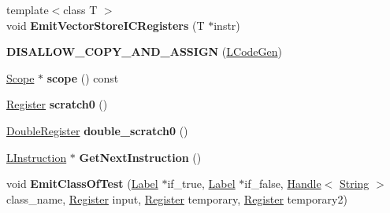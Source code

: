 \begin{DoxyCompactItemize}
\item 
{\footnotesize template$<$class T $>$ }\\void {\bfseries Emit\+Vector\+Store\+I\+C\+Registers} (T $\ast$instr)\hypertarget{classv8_1_1internal_1_1_l_code_gen_a84c9b0e87f89361233a5c74e43d689cb}{}\label{classv8_1_1internal_1_1_l_code_gen_a84c9b0e87f89361233a5c74e43d689cb}

\item 
{\bfseries D\+I\+S\+A\+L\+L\+O\+W\+\_\+\+C\+O\+P\+Y\+\_\+\+A\+N\+D\+\_\+\+A\+S\+S\+I\+GN} (\hyperlink{classv8_1_1internal_1_1_l_code_gen}{L\+Code\+Gen})\hypertarget{classv8_1_1internal_1_1_l_code_gen_a475eb7b3d7738263ae865905cf36b985}{}\label{classv8_1_1internal_1_1_l_code_gen_a475eb7b3d7738263ae865905cf36b985}

\item 
\hyperlink{classv8_1_1internal_1_1_scope}{Scope} $\ast$ {\bfseries scope} () const \hypertarget{classv8_1_1internal_1_1_l_code_gen_a2b85c964ccc4e59f50d49d19b0ed5ce0}{}\label{classv8_1_1internal_1_1_l_code_gen_a2b85c964ccc4e59f50d49d19b0ed5ce0}

\item 
\hyperlink{structv8_1_1internal_1_1_register}{Register} {\bfseries scratch0} ()\hypertarget{classv8_1_1internal_1_1_l_code_gen_a9ebee5eebe5fb0c13a6830fc3a0d96d5}{}\label{classv8_1_1internal_1_1_l_code_gen_a9ebee5eebe5fb0c13a6830fc3a0d96d5}

\item 
\hyperlink{structv8_1_1internal_1_1_double_register}{Double\+Register} {\bfseries double\+\_\+scratch0} ()\hypertarget{classv8_1_1internal_1_1_l_code_gen_a4f5cc0bfde0e504263fc281ec4150e5c}{}\label{classv8_1_1internal_1_1_l_code_gen_a4f5cc0bfde0e504263fc281ec4150e5c}

\item 
\hyperlink{classv8_1_1internal_1_1_l_instruction}{L\+Instruction} $\ast$ {\bfseries Get\+Next\+Instruction} ()\hypertarget{classv8_1_1internal_1_1_l_code_gen_a3089f4ba7e1cc640f81ca419fb0d39fa}{}\label{classv8_1_1internal_1_1_l_code_gen_a3089f4ba7e1cc640f81ca419fb0d39fa}

\item 
void {\bfseries Emit\+Class\+Of\+Test} (\hyperlink{classv8_1_1internal_1_1_label}{Label} $\ast$if\+\_\+true, \hyperlink{classv8_1_1internal_1_1_label}{Label} $\ast$if\+\_\+false, \hyperlink{classv8_1_1internal_1_1_handle}{Handle}$<$ \hyperlink{classv8_1_1internal_1_1_string}{String} $>$ class\+\_\+name, \hyperlink{structv8_1_1internal_1_1_register}{Register} input, \hyperlink{structv8_1_1internal_1_1_register}{Register} temporary, \hyperlink{structv8_1_1internal_1_1_register}{Register} temporary2)\hypertarget{classv8_1_1internal_1_1_l_code_gen_aae86e9c7161b47dc83e86e0ef0402a43}{}\label{classv8_1_1internal_1_1_l_code_gen_aae86e9c7161b47dc83e86e0ef0402a43}


\end{DoxyCompactItemize}

